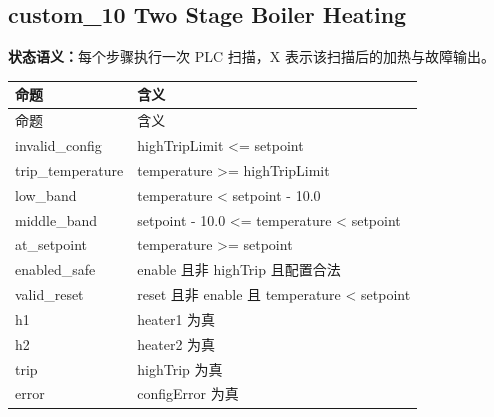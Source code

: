 \subsection{{\ttfamily custom\_10} Two Stage Boiler Heating}

\noindent\textbf{状态语义：}每个步骤执行一次 PLC 扫描，X 表示该扫描后的加热与故障输出。

\begin{longtable}{L{3.3cm}L{10.0cm}}

\toprule

命题 & 含义\\

\midrule

\endfirsthead

\toprule

命题 & 含义\\

\midrule

\endhead

{\ttfamily invalid\_config} & highTripLimit <= setpoint\\

{\ttfamily trip\_temperature} & temperature >= highTripLimit\\

{\ttfamily low\_band} & temperature < setpoint - 10.0\\

{\ttfamily middle\_band} & setpoint - 10.0 <= temperature < setpoint\\

{\ttfamily at\_setpoint} & temperature >= setpoint\\

{\ttfamily enabled\_safe} & enable 且非 highTrip 且配置合法\\

{\ttfamily valid\_reset} & reset 且非 enable 且 temperature < setpoint\\

{\ttfamily h1} & heater1 为真\\

{\ttfamily h2} & heater2 为真\\

{\ttfamily trip} & highTrip 为真\\

{\ttfamily error} & configError 为真\\

\bottomrule

\end{longtable}

